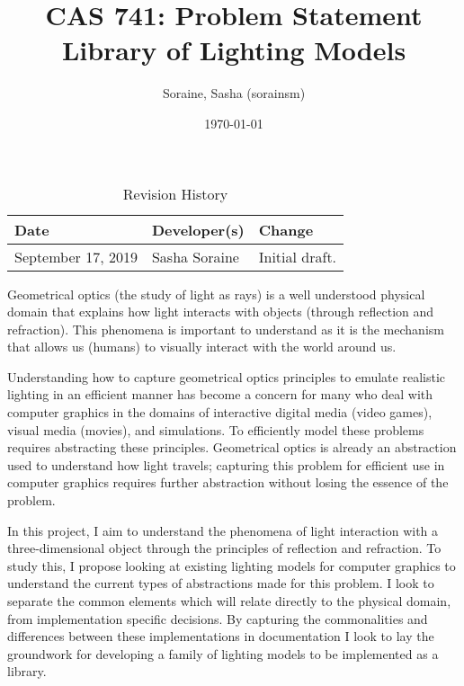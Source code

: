 \documentclass{article}
\title{CAS 741: Problem Statement\\Library of Lighting Models}
\author{Soraine, Sasha (sorainsm)}
\date{\today}
\begin{document}
\maketitle

\begin{table}[hp]
\caption{Revision History} \label{TblRevisionHistory}
\begin{tabularx}{\textwidth}{llX}
\toprule
\textbf{Date} & \textbf{Developer(s)} & \textbf{Change}\\
\midrule
September 17, 2019 & Sasha Soraine & Initial draft.\\

\bottomrule
\end{tabularx}
\end{table}

Geometrical optics (the study of light as rays) is a well understood physical 
domain that explains how light interacts with objects (through reflection and 
refraction). This phenomena is important to understand as it is the 
mechanism that allows us (humans) to visually interact with the world around 
us. 

Understanding how to capture geometrical optics principles to 
emulate realistic lighting in an efficient manner has become a concern for many 
who deal with computer graphics in the domains of interactive digital media 
(video games), visual media (movies), and simulations. To efficiently model 
these problems requires abstracting these principles.  Geometrical optics is 
already an abstraction used to understand how light travels; capturing this 
problem for efficient use in computer graphics requires further abstraction 
without losing the essence of the problem.

In this project, I aim to understand the phenomena of light interaction with a 
three-dimensional object through the principles of reflection and refraction. 
To study this, I propose looking at existing lighting models for computer 
graphics to understand the current types of abstractions made for this problem. 
I look to separate the common elements which will relate directly to the 
physical domain, from implementation specific decisions. By capturing the 
commonalities and differences between these implementations in documentation I 
look to lay the groundwork for developing a family of lighting models to be 
implemented as a library.

%
%
%
\end{document}
